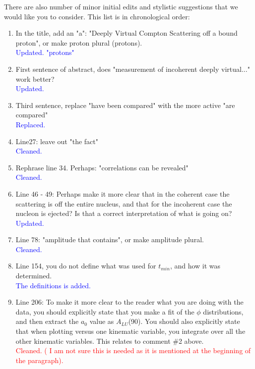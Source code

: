 \documentclass[a4paper,11pt,twoside]{article}
\begin{document}
There are also number of minor initial edits and stylistic suggestions that we 
would like you to consider. This list is in chronological order:

\begin{enumerate}
  
\item    In the title, add an "a":  "Deeply Virtual Compton Scattering off a bound proton", or make proton plural (protons).\\
   \textcolor{blue}{Updated. "protons"}

\item    First sentence of abstract, does "measurement of incoherent deeply 
   virtual..." work better?\\
   \textcolor{blue}{Updated. }

\item    Third sentence, replace "have been compared" with the more active "are compared"\\
   \textcolor{blue}{Replaced. }

\item    Line27: leave out "the fact"\\
   \textcolor{blue}{Cleaned. }

\item    Rephrase line 34. Perhaps:  "correlations can be revealed"\\
   \textcolor{blue}{Cleaned. }

\item    Line 46 - 49: Perhaps make it more clear that in the coherent case the scattering is off the entire nucleus, and that for the incoherent case the nucleon is ejected? Is that a correct interpretation of what is going on?\\
   \textcolor{blue}{Updated.}

\item    Line 78: "amplitude that contains", or make amplitude plural.\\
   \textcolor{blue}{Cleaned.}

\item    Line 154, you do not define what was used for $t_{min}$, and how it 
   was determined.\\
   \textcolor{blue}{The definitions is added.}

\item    Line 206: To make it more clear to the reader what you are doing with 
   the data, you should explicitly state that you make a fit of the $\phi$ 
      distributions, and then extract the $a_0$ value as $A_{LU}$(90). You 
      should also explicitly state that when plotting versus one kinematic 
      variable, you integrate over all the other kinematic variables. This 
      relates to comment \#2 above.\\
      \textcolor{red}{Cleaned. ( I am not sure this is needed as it is 
      mentioned at the beginning of the paragraph).}


\end{enumerate}
\end{document}
